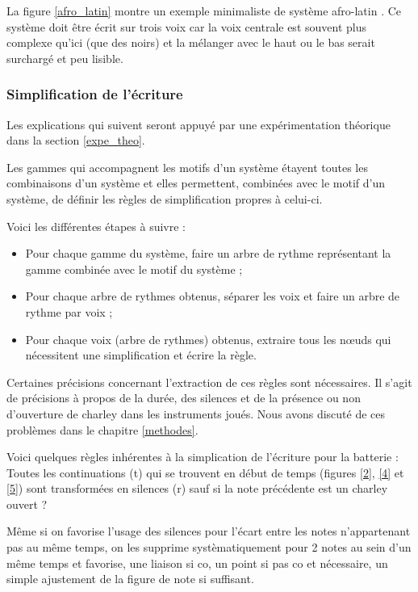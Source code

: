 La figure \ref{afro_latin} montre un exemple minimaliste de système afro-latin \cite{system_drums}. 
Ce système doit être écrit sur trois voix car la voix centrale est souvent plus complexe qu’ici (que des noirs) et la mélanger avec le haut ou le bas serait surchargé et peu lisible.

\subsubsection{Simplification de l’écriture}
Les explications qui suivent seront appuyé par une expérimentation théorique dans la section \ref{expe_theo}.

Les gammes qui accompagnent les motifs d’un système étayent toutes les combinaisons d’un système et elles permettent, combinées avec le motif d’un système, de définir les règles de simplification propres à celui-ci.

Voici les différentes étapes à suivre :
\begin{itemize}
	\item Pour chaque gamme du système, faire un arbre de rythme représentant la gamme combinée avec le motif du système ;
	\item Pour chaque arbre de rythmes obtenus, séparer les voix et faire un arbre de rythme par voix ;
	\item Pour chaque voix (arbre de rythmes) obtenus, extraire tous les nœuds qui nécessitent une simplification et écrire la règle.
\end{itemize}

Certaines précisions concernant l’extraction de ces règles sont nécessaires. 
Il s’agit de précisions à propos de la durée, des silences et de la présence ou non d’ouverture de charley dans les instruments joués. 
Nous avons discuté de ces problèmes dans le chapitre \ref{methodes}.

Voici quelques règles inhérentes à la simplication de l’écriture pour la batterie :
Toutes les continuations (t) qui se trouvent en début de temps 
(figures \ref{2}, \ref{4} et \ref{5}) sont transformées en silences (r) sauf si la note précédente est un charley ouvert ?

Même si on favorise l’usage des silences pour l’écart entre les notes n’appartenant pas au même temps, on les supprime systèmatiquement pour 2 notes au sein d’un même temps et favorise, une liaison si co, un point si pas co et nécessaire, un simple ajustement de la figure de note si suffisant.

